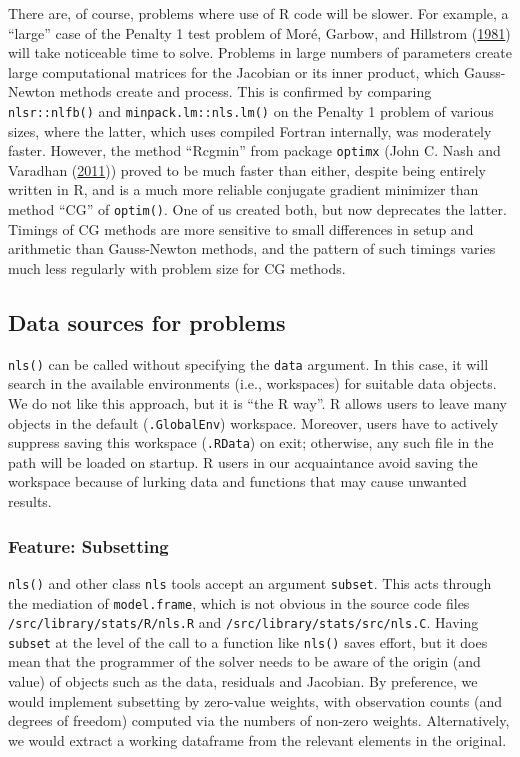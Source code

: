 There are, of course, problems where use of R code will be slower. For example, a
``large'' case of the Penalty 1 test problem of Moré, Garbow, and Hillstrom (\protect\hyperlink{ref-More1981TUO}{1981}) will take
noticeable time to solve. Problems in large numbers of parameters
create large computational matrices for the Jacobian or its inner product,
which Gauss-Newton methods create and process.
This is confirmed by comparing \texttt{nlsr::nlfb()} and \texttt{minpack.lm::nls.lm()} on
the Penalty 1 problem of various sizes, where the latter, which uses
compiled Fortran internally, was moderately faster. However, the method
``Rcgmin'' from package \texttt{optimx} (John C. Nash and Varadhan (\protect\hyperlink{ref-p-optimx}{2011})) proved to be much
faster than either, despite being entirely written in R, and is a much more
reliable conjugate gradient minimizer than method ``CG'' of \texttt{optim()}. One
of us created both, but now deprecates the latter.
Timings of CG methods are more sensitive to small differences in
setup and arithmetic than Gauss-Newton methods, and the pattern of
such timings varies much less regularly with problem size for CG methods.

\hypertarget{data-sources-for-problems}{%
\subsection{Data sources for problems}\label{data-sources-for-problems}}

\texttt{nls()} can be called without specifying the \texttt{data} argument. In this case, it will
search in the available environments (i.e., workspaces) for suitable data objects.
We do not like this approach, but it is ``the R way''. R allows users to leave many
objects in the default (\texttt{.GlobalEnv}) workspace. Moreover, users have to actively
suppress saving this workspace (\texttt{.RData}) on exit; otherwise, any such file in
the path will be loaded on startup. R users in our
acquaintance avoid saving the workspace because of lurking data and
functions that may cause unwanted results.

\hypertarget{feature-subsetting}{%
\subsubsection{Feature: Subsetting}\label{feature-subsetting}}

\texttt{nls()} and other class \texttt{nls} tools accept an argument \texttt{subset}. This acts through
the mediation of \texttt{model.frame}, which is not obvious in the
source code files \texttt{/src/library/stats/R/nls.R} and \texttt{/src/library/stats/src/nls.C}.
Having \texttt{subset} at the level of the call to a function like
\texttt{nls()} saves effort, but it does mean that the programmer of the
solver needs to be aware of the
origin (and value) of objects such as the data, residuals and Jacobian.
By preference,
we would implement subsetting by zero-value weights, with observation counts
(and degrees of freedom) computed via the numbers of non-zero weights. Alternatively,
we would extract a working dataframe from the relevant elements in the original.

